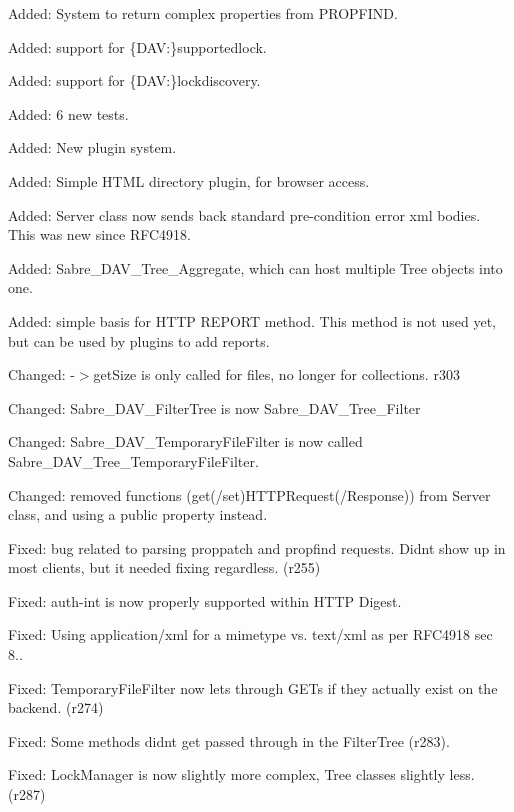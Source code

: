 \begin{DoxyItemize}
\item Added\+: System to return complex properties from P\+R\+O\+P\+F\+I\+ND.
\item Added\+: support for \{D\+AV\+:\}supportedlock.
\item Added\+: support for \{D\+AV\+:\}lockdiscovery.
\item Added\+: 6 new tests.
\item Added\+: New plugin system.
\item Added\+: Simple H\+T\+ML directory plugin, for browser access.
\item Added\+: Server class now sends back standard pre-\/condition error xml bodies. This was new since R\+F\+C4918.
\item Added\+: Sabre\+\_\+\+D\+A\+V\+\_\+\+Tree\+\_\+\+Aggregate, which can \textquotesingle{}host\textquotesingle{} multiple Tree objects into one.
\item Added\+: simple basis for H\+T\+TP R\+E\+P\+O\+RT method. This method is not used yet, but can be used by plugins to add reports.
\item Changed\+: -\/$>$get\+Size is only called for files, no longer for collections. r303
\item Changed\+: Sabre\+\_\+\+D\+A\+V\+\_\+\+Filter\+Tree is now Sabre\+\_\+\+D\+A\+V\+\_\+\+Tree\+\_\+\+Filter
\item Changed\+: Sabre\+\_\+\+D\+A\+V\+\_\+\+Temporary\+File\+Filter is now called Sabre\+\_\+\+D\+A\+V\+\_\+\+Tree\+\_\+\+Temporary\+File\+Filter.
\item Changed\+: removed functions (get(/set)H\+T\+T\+P\+Request(/\+Response)) from Server class, and using a public property instead.
\item Fixed\+: bug related to parsing proppatch and propfind requests. Didn\textquotesingle{}t show up in most clients, but it needed fixing regardless. (r255)
\item Fixed\+: auth-\/int is now properly supported within H\+T\+TP Digest.
\item Fixed\+: Using application/xml for a mimetype vs. text/xml as per R\+F\+C4918 sec 8..
\item Fixed\+: Temporary\+File\+Filter now lets through G\+ET\textquotesingle{}s if they actually exist on the backend. (r274)
\item Fixed\+: Some methods didn\textquotesingle{}t get passed through in the Filter\+Tree (r283).
\item Fixed\+: Lock\+Manager is now slightly more complex, Tree classes slightly less. (r287)
\end{DoxyItemize}

